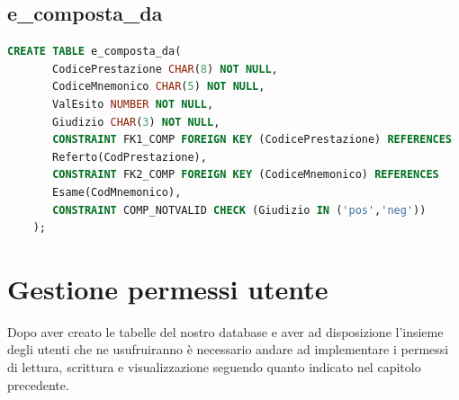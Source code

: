 \documentclass[12pt]{report}
\begin{document}
\subsection*{e\_composta\_da}
\begin{lstlisting}[language=SQL]
    CREATE TABLE e_composta_da(
	   CodicePrestazione CHAR(8) NOT NULL,
	   CodiceMnemonico CHAR(5) NOT NULL,
	   ValEsito NUMBER NOT NULL,
	   Giudizio CHAR(3) NOT NULL,
	   CONSTRAINT FK1_COMP FOREIGN KEY (CodicePrestazione) REFERENCES
	   Referto(CodPrestazione),
	   CONSTRAINT FK2_COMP FOREIGN KEY (CodiceMnemonico) REFERENCES
	   Esame(CodMnemonico),
	   CONSTRAINT COMP_NOTVALID CHECK (Giudizio IN ('pos','neg'))
    );
\end{lstlisting}

\newpage

\section{Gestione permessi utente}
Dopo aver creato le tabelle del nostro database e aver ad disposizione l'insieme degli utenti che ne usufruiranno è necessario andare ad implementare i permessi di lettura, scrittura e visualizzazione seguendo quanto indicato nel capitolo precedente.
\end{document}
